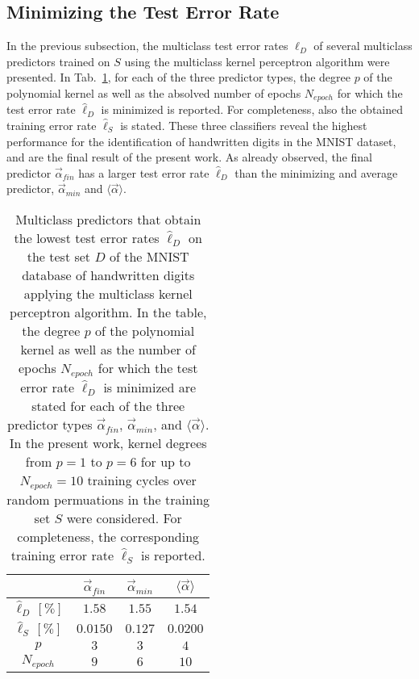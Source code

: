 \clearpage

\subsection{Minimizing the Test Error Rate}\label{subsec:best_pred}
In the previous subsection, the multiclass test error rates $\hat{\ell}_D$ of several multiclass predictors trained on $S$ using the multiclass kernel perceptron algorithm were presented. In Tab.~\ref{tab:min_test}, for each of the three predictor types, the degree $p$ of the polynomial kernel as well as the absolved number of epochs $N_{epoch}$ for which the test error rate $\hat{\ell}_D$ is minimized is reported. For completeness, also the obtained training error rate $\hat{\ell}_S$ is stated. These three classifiers reveal the highest performance for the identification of handwritten digits in the MNIST dataset, and are the final result of the present work. As already observed, the final predictor $\vec{\alpha}_{fin}$ has a larger test error rate $\hat{\ell}_D$ than the minimizing and average predictor, $\vec{\alpha}_{min}$ and $\langle\vec{\alpha}\rangle$.

\begin{table}[h!]
\centering
\begin{tabular}{c||c|c|c}
& $\vec{\alpha}_{fin}$ & $\vec{\alpha}_{min}$ & $\langle \vec{\alpha} \rangle$\\
\hline
\hline
$\hat{\ell}_D\,[\%]$ & \boldmath$1.58$ & \boldmath$1.55$ & \boldmath$1.54$\\
$\hat{\ell}_S\,[\%]$ & $0.0150$ & $0.127$ & $0.0200$ \\
$p$ & $3$ & $3$ & $4$\\
$N_{epoch}$ & $9$ & $6$ & $10$
\end{tabular}
\caption{Multiclass predictors that obtain the lowest test error rates $\hat{\ell}_D$ on the test set $D$ of the MNIST database of handwritten digits applying the multiclass kernel perceptron algorithm. In the table, the degree $p$ of the polynomial kernel as well as the number of epochs $N_{epoch}$ for which the test error rate $\hat{\ell}_D$ is minimized are stated for each of the three predictor types $\vec{\alpha}_{fin}$, $\vec{\alpha}_{min}$, and $\langle\vec{\alpha}\rangle$. In the present work, kernel degrees from $p=1$ to $p=6$ for up to $N_{epoch}=10$ training cycles over random permuations in the training set $S$ were considered. For completeness, the corresponding training error rate $\hat{\ell}_S$ is reported.}
\label{tab:min_test}
\end{table}


